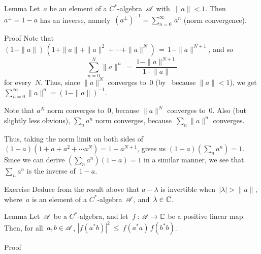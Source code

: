 \documentclass[main]{subfiles}
\begin{document}
%
%
\begin{parsec}[geometric]%
\begin{point}{Lemma}%
Let~$a$ be an element of a $C^*$-algebra~$\mathscr{A}$ with~$\|a\|<1$.
Then~$a^\perp=1-a$ has an inverse,
namely~$(a^\perp)^{-1}= \sum_{n=0}^\infty\, a^n$
(norm convergence).
\end{point}
\begin{point}{Proof}%
Note that
$(1-\|a\|)\,(1+\|a\|+\|a\|^2+\dotsb+\|a\|^N) \,=\, 1-\|a\|^{N+1}$,
and so 
\begin{equation*}
\sum_{n=0}^N \|a\|^n \ =\  \frac{1-\|a\|^{N+1}}{1-\|a\|}
\end{equation*}
for every~$N$.
Thus,
since $\|a\|^N$ converges to~$0$
(by~\TODO{} because $\|a\|<1$),
we  get $\sum_{n=0}^\infty \|a\|^n = (1-\|a\|)^{-1}$.

\begin{point}%
Note that $a^N$ norm converges to~$0$,
because $\|a\|^N$ converges to~$0$.
Also (but slightly less obvious),
$\sum_n a^n$ norm converges,
because~$\sum_n \|a\|^n$ converges.
\end{point}
\begin{point}%
Thus, taking the norm limit
on both sides of $(1-a)(1+a+a^2+\dotsb a^N) = 1-a^{N+1}$,
gives us $(1-a)(\sum_n a^n) = 1$.
Since we can derive $(\sum_n a^n)(1-a) = 1$
in a similar manner, 
we see that $\sum_n a^n$ is the inverse of~$1-a$.
\end{point}
\end{point}
\begin{point}{Exercise}
Deduce from the result above that $a-\lambda$ is invertible
when~$|\lambda|>\|a\|$,
where~$a$ is an element of a $C^*$-algebra~$\mathscr{A}$,
and~$\lambda\in\mathbb{C}$.
\end{point}
\end{parsec}
%
%
\begin{parsec}[cstar-cs]%
\begin{point}{Lemma}%
Let~$\mathscr{A}$ be a $C^*$-algebra,
and let~$f\colon \mathscr{A}\to \mathbb{C}$ be a positive linear map.\\
Then, for all~$a,b\in\mathscr{A}$,\quad
$\left|f(a^*b)\right|^2 \ \leq\ f(a^*a)\,f(b^*b)$.
\end{point}
\begin{point}{Proof}%
\end{point}
\end{parsec}
\end{document}
